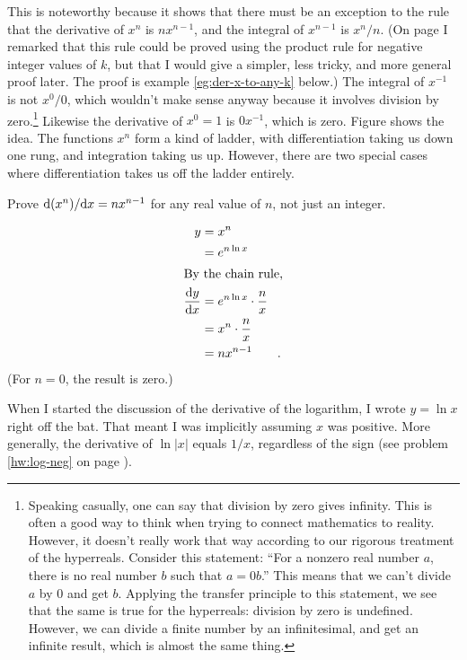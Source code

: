 This is noteworthy because it shows that there must be an exception to the rule
that the derivative of $x^n$ is $nx^{n-1}$, and the integral of $x^{n-1}$ is
$x^n/n$. (On page \pageref{coy-der-x-to-neg-k} I remarked that this rule could
be proved using the product rule for negative integer values of $k$, but that I would
give a simpler, less tricky, and more general proof later. The proof is example
\ref{eg:der-x-to-any-k} below.) The integral of $x^{-1}$ is not $x^0/0$, which wouldn't make sense anyway
because it involves division by zero.\footnote{Speaking casually, one can say  that
division by zero gives infinity. This is often a good way to think when trying to
connect mathematics to reality. However, it doesn't really work that way according
to our rigorous treatment of the hyperreals. Consider this statement:
``For a nonzero real number $a$, there is no real number $b$ such that $a=0b$.''
This means that we can't divide $a$ by 0 and get $b$. Applying the transfer principle
to this statement, we see that the same is true for the hyperreals: division by zero
is undefined. However, we can divide a finite number by an infinitesimal, and get
an infinite result, which is almost the same thing.} Likewise the derivative of
$x^0=1$ is $0x^{-1}$, which is zero. Figure  shows the idea.
The functions $x^n$ form a kind of ladder, with differentiation taking us down
one rung, and integration taking us up. However, there are two special cases where differentiation
takes us off the ladder entirely.

\begin{eg}\label{eg:der-x-to-any-k}
\egquestion Prove $\textup{d}(x^n)/\textup{d} x=nx^{n-1}$ for any real value of $n$, not just an integer.

\eganswer
\begin{align*}
  y &= x^n \\
    &= e^{n \ln x} \\
\intertext{By the chain rule,}
  \frac{\textup{d} y}{\textup{d} x} &= e^{n \ln x} \cdot \frac{n}{x} \\
                        &= x^n \cdot \frac{n}{x} \\
                        &= nx^{n-1} \qquad .
\end{align*}
(For $n=0$, the result is zero.)
\end{eg}

When I started the discussion of the derivative of the logarithm, I wrote $y=\ln x$ right
off the bat. That meant I was implicitly assuming $x$ was positive.\label{log-neg}
More generally, the derivative of $\ln|x|$ equals $1/x$, regardless of the sign (see
problem \ref{hw:log-neg} on page \pageref{hw:log-neg}).

